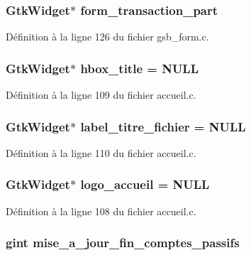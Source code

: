 \subsubsection[{form\_\-transaction\_\-part}]{\setlength{\rightskip}{0pt plus 5cm}GtkWidget$\ast$ {\bf form\_\-transaction\_\-part}}\label{accueil_8c_afb5de72ed97c05cc117b44cf61adfb86}


Définition à la ligne 126 du fichier gsb\_\-form.c.

\subsubsection[{hbox\_\-title}]{\setlength{\rightskip}{0pt plus 5cm}GtkWidget$\ast$ {\bf hbox\_\-title} = NULL}\label{accueil_8c_a5c4177f9546fc12979a20354c696c96a}


Définition à la ligne 109 du fichier accueil.c.

\subsubsection[{label\_\-titre\_\-fichier}]{\setlength{\rightskip}{0pt plus 5cm}GtkWidget$\ast$ {\bf label\_\-titre\_\-fichier} = NULL}\label{accueil_8c_ad5a5e4da0960d4245ba98245c3a868dc}


Définition à la ligne 110 du fichier accueil.c.

\subsubsection[{logo\_\-accueil}]{\setlength{\rightskip}{0pt plus 5cm}GtkWidget$\ast$ {\bf logo\_\-accueil} = NULL}\label{accueil_8c_a54bbf4c2b1a287f2b68dd985bc3df3a0}


Définition à la ligne 108 du fichier accueil.c.

\subsubsection[{mise\_\-a\_\-jour\_\-fin\_\-comptes\_\-passifs}]{\setlength{\rightskip}{0pt plus 5cm}gint {\bf mise\_\-a\_\-jour\_\-fin\_\-comptes\_\-passifs}}\label{accueil_8c_a9ebd251de44611d97ec364d1867a75ff}



